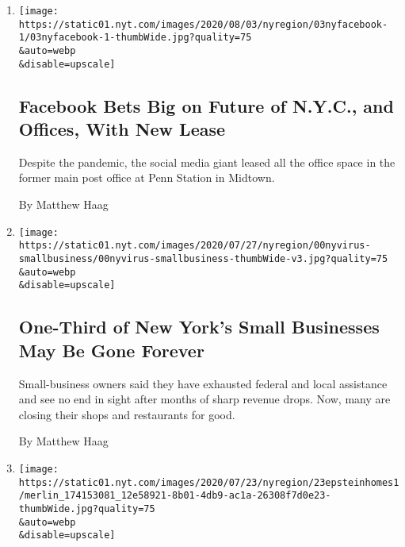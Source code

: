 \begin{enumerate}
\def\labelenumi{\arabic{enumi}.}
\item
  \href{/2020/08/03/nyregion/facebook-nyc-office-farley-building.html}{}

  \texttt{[image: https://static01.nyt.com/images/2020/08/03/nyregion/03nyfacebook-1/03nyfacebook-1-thumbWide.jpg?quality=75\\\&auto=webp\\\&disable=upscale]}

  \hypertarget{facebook-bets-big-on-future-of-nyc-and-offices-with-new-lease}{%
  \subsection{Facebook Bets Big on Future of N.Y.C., and Offices, With
  New
  Lease}\label{facebook-bets-big-on-future-of-nyc-and-offices-with-new-lease}}

  Despite the pandemic, the social media giant leased all the office
  space in the former main post office at Penn Station in Midtown.

  By Matthew Haag
\item
  \href{/2020/08/03/nyregion/nyc-small-businesses-closing-coronavirus.html}{}

  \texttt{[image: https://static01.nyt.com/images/2020/07/27/nyregion/00nyvirus-smallbusiness/00nyvirus-smallbusiness-thumbWide-v3.jpg?quality=75\\\&auto=webp\\\&disable=upscale]}

  \hypertarget{one-third-of-new-yorks-small-businesses-may-be-gone-forever}{%
  \subsection{One-Third of New York's Small Businesses May Be Gone
  Forever}\label{one-third-of-new-yorks-small-businesses-may-be-gone-forever}}

  Small-business owners said they have exhausted federal and local
  assistance and see no end in sight after months of sharp revenue
  drops. Now, many are closing their shops and restaurants for good.

  By Matthew Haag
\item
  \href{/2020/07/23/nyregion/jeffrey-epstein-address-homes.html}{}

  \texttt{[image: https://static01.nyt.com/images/2020/07/23/nyregion/23epsteinhomes1/merlin\_174153081\_12e58921-8b01-4db9-ac1a-26308f7d0e23-thumbWide.jpg?quality=75\\\&auto=webp\\\&disable=upscale]}

  \hypertarget{epstein-mansions-in-new-york-and-palm-beach-for-sale-for-110-million}{%
}
\end{enumerate}
